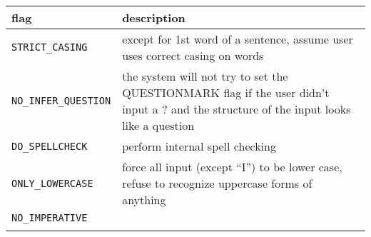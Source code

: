\documentclass[]{article}
\begin{document}
\begin{longtable}[]{@{}ll@{}}
\toprule
\begin{minipage}[b]{0.07\columnwidth}\raggedright\strut
flag\strut
\end{minipage} & \begin{minipage}[b]{0.10\columnwidth}\raggedright\strut
description\strut
\end{minipage}\tabularnewline
\midrule
\endhead
\begin{minipage}[t]{0.07\columnwidth}\raggedright\strut
\texttt{STRICT\_CASING}\strut
\end{minipage} & \begin{minipage}[t]{0.10\columnwidth}\raggedright\strut
except for 1st word of a sentence, assume user uses correct casing on
words\strut
\end{minipage}\tabularnewline
\begin{minipage}[t]{0.07\columnwidth}\raggedright\strut
\texttt{NO\_INFER\_QUESTION}\strut
\end{minipage} & \begin{minipage}[t]{0.10\columnwidth}\raggedright\strut
the system will not try to set the QUESTIONMARK flag if the user didn't
input a ? and the structure of the input looks like a question\strut
\end{minipage}\tabularnewline
\begin{minipage}[t]{0.07\columnwidth}\raggedright\strut
\texttt{DO\_SPELLCHECK}\strut
\end{minipage} & \begin{minipage}[t]{0.10\columnwidth}\raggedright\strut
perform internal spell checking\strut
\end{minipage}\tabularnewline
\begin{minipage}[t]{0.07\columnwidth}\raggedright\strut
\texttt{ONLY\_LOWERCASE}\strut
\end{minipage} & \begin{minipage}[t]{0.10\columnwidth}\raggedright\strut
force all input (except ``I'') to be lower case, refuse to recognize
uppercase forms of anything\strut
\end{minipage}\tabularnewline
\begin{minipage}[t]{0.07\columnwidth}\raggedright\strut
\texttt{NO\_IMPERATIVE}\strut
\end{minipage} & \begin{minipage}[t]{0.10\columnwidth}\raggedright\strut
\strut
\end{minipage}\tabularnewline
\begin{minipage}[t]{0.07\columnwidth}\raggedright\strut

\end{minipage}
\end{longtable}
\end{document}
